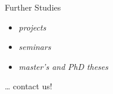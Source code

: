\begin{frame}[label=Exam]{\myframetitle}
\begin{mycolumns}
		\begin{note}{Further Studies}
			\begin{itemize}
				\item \emph{projects}
				\item \emph{seminars}
				\item \emph{master's and PhD theses}
			\end{itemize}
			\ldots{} contact us!
		\end{note}
	\end{mycolumns}
\end{frame}